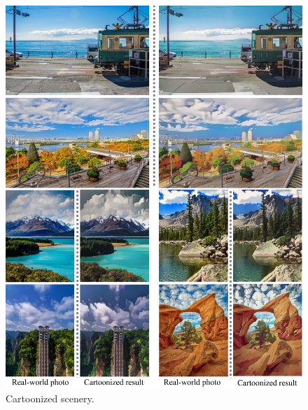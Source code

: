 \documentclass[10pt,twocolumn,letterpaper]{article}
\begin{document}
\begin{figure}[b]
\centering
\includegraphics[width=\linewidth]{figures/scenery2.pdf}
\caption{Cartoonized scenery.}
\label{fig:scenery2}
\end{figure}
\end{document}

